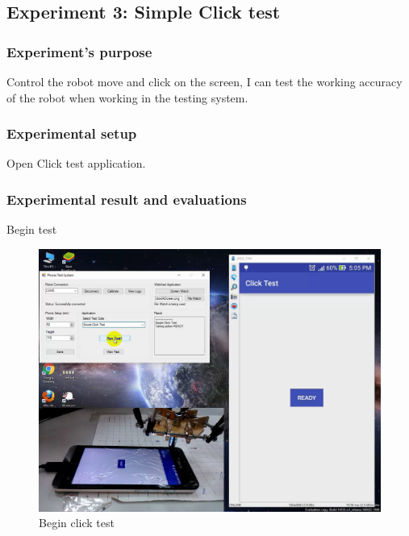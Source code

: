 \subsection{Experiment 3: Simple Click test}
\subsubsection{Experiment's purpose}
Control the robot move and click on the screen, I can test the working accuracy of the robot when working in the testing system.
\subsubsection{Experimental setup}
Open Click test application.
\subsubsection{Experimental result and evaluations}
Begin test
	\begin{figure}[H]
		\centering
		\includegraphics[width=\maxwidth{15cm}, keepaspectratio]{Chapters/Fig/click_start.png}
		\caption{Begin click test}
		\label{fig:click_start}
	\end{figure}

